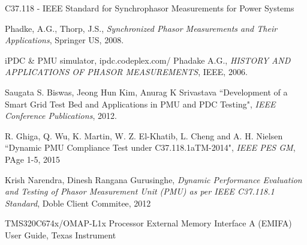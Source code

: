 \begin{thebibliography}{25}
 C37.118 - IEEE Standard for Synchrophasor Measurements for Power Systems

Phadke, A.G., Thorp, J.S.,  \textit{Synchronized Phasor Measurements and Their Applications}, Springer US, 2008.

iPDC \& PMU simulator, ipdc.codeplex.com/ 
Phadake A.G., \textit{HISTORY AND APPLICATIONS OF PHASOR MEASUREMENTS}, IEEE, 2006.

Saugata S. Biswas, Jeong Hun Kim, Anurag K Srivastava ``Development of a Smart Grid Test Bed and Applications in PMU and PDC Testing", \textit{IEEE Conference Publications}, 2012.

R. Ghiga, Q. Wu, K. Martin, W. Z. El-Khatib, L. Cheng and A. H. Nielsen ``Dynamic PMU Compliance Test under C37.118.1aTM-2014", \textit{IEEE PES GM}, PAge 1-5, 2015

Krish Narendra, Dinesh Rangana Gurusinghe, \textit{Dynamic Performance Evaluation and Testing of Phasor Measurement Unit (PMU) as per IEEE C37.118.1 Standard}, Doble Client Commitee, 2012 

TMS320C674x/OMAP-L1x Processor External Memory Interface A (EMIFA) User Guide, Texas Instrument
\end{thebibliography}
